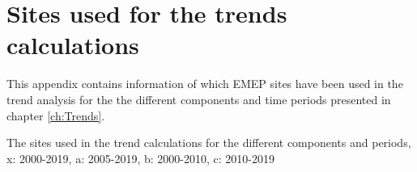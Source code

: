 \setcounter{page}{1}

\cleardoublepage
\chapter[Trends 2000-2019]{Sites used for the trends calculations}
\label{ch:appx_trends}
This appendix contains information of which EMEP sites have been used in the trend analysis for the the different components and time periods presented in chapter \ref{ch:Trends}.

\clearpage

\begin{table}
\caption{\label{tab:sites_trend} The sites used in the trend calculations for the different components and periods, x: 2000-2019, a: 2005-2019, b: 2000-2010, c: 2010-2019}
\centering{
\scalebox{0.65}{%

}}
\end{table}
